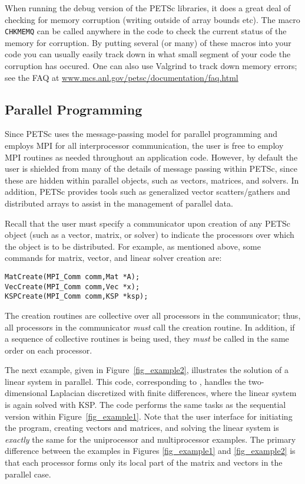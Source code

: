 {{When running the debug version of the PETSc libraries, it
does a great deal of checking for memory corruption (writing outside of
array bounds etc). The macro \lstinline{CHKMEMQ} can be called
anywhere in the code to check the current status of the memory for corruption.
By putting several (or many) of these macros into your code you can usually
easily track down in what small segment of your code the corruption has occured.
One can also use Valgrind to track down memory errors; see the FAQ at
\href{http://www.mcs.anl.gov/petsc/documentation/faq.html}{www.mcs.anl.gov/petsc/documentation/faq.html}

\subsection*{Parallel Programming}
Since PETSc uses the message-passing model for
parallel programming and employs MPI for all interprocessor
communication, the user is free to employ MPI routines as needed
throughout an application code.  However, by default the user is
shielded from many of the details of message passing within PETSc,
since these are hidden within parallel objects, such as vectors,
matrices, and solvers.  In addition, PETSc provides tools such as
generalized vector scatters/gathers and distributed arrays to assist
in the management of parallel data.

Recall that the user must specify a communicator upon creation of any
PETSc object (such as a vector, matrix, or solver) to indicate the
processors over which the object is to be distributed.  For example,
as mentioned above, some commands for matrix, vector, and linear solver
creation are:
\begin{lstlisting}
MatCreate(MPI_Comm comm,Mat *A);
VecCreate(MPI_Comm comm,Vec *x);
KSPCreate(MPI_Comm comm,KSP *ksp);
\end{lstlisting}
The creation routines are collective over all processors in the
communicator; thus, all processors in the communicator {\em must}
call the creation routine.  In addition, if a sequence of
collective routines is being used, they {\em must} be called
in the same order on each processor.

The next example, given in Figure~\ref{fig_example2}, illustrates the
solution of a linear system in parallel.  This code, corresponding to
\href{http://www.mcs.anl.gov/petsc/petsc-current/src/ksp/ksp/examples/tutorials/ex3.c.html}{}, handles the
two-dimensional Laplacian discretized with finite differences, where
the linear system is again solved with KSP.  The code performs the
same tasks as the sequential version within Figure~\ref{fig_example1}.
Note that the user interface for initiating the program, creating
vectors and matrices, and solving the linear system is {\em exactly}
the same for the uniprocessor and multiprocessor examples.  The
primary difference between the examples in Figures \ref{fig_example1}
and \ref{fig_example2} is that each processor forms only its local
part of the matrix and vectors in the parallel case.

}}
